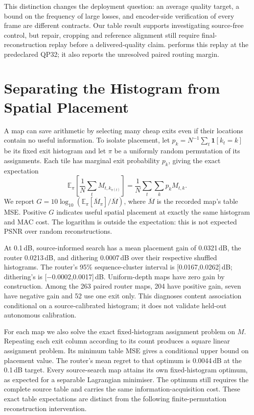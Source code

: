This distinction changes the deployment question: an average quality target,
a bound on the frequency of large losses, and encoder-side verification of
every frame are different contracts. Our table result supports investigating
source-free control, but repair, cropping and reference alignment still
require final-reconstruction replay before a delivered-quality claim.
 performs this replay at the predeclared QP32; it
also reports the unresolved paired routing margin.

\section{Separating the Histogram from Spatial Placement}

A map can save arithmetic by selecting many cheap exits even if their
locations contain no useful information. To isolate placement, let
$p_k=N^{-1}\sum_t\mathbf{1}[k_t=k]$ be its fixed exit histogram and let
$\pi$ be a uniformly random permutation of its assignments. Each tile has
marginal exit probability $p_k$, giving the exact expectation
\begin{equation}
 \mathbb{E}_{\pi}\!\left[\frac1N\sum_t M_{t,k_{\pi(t)}}\right]
 =\frac1N\sum_t\sum_k p_k M_{t,k}.
 \label{eq:permutation}
\end{equation}
We report $G=10\log_{10}(\mathbb E_\pi[\overline M_\pi]/\overline M)$,
where $\overline M$ is the recorded map's table MSE. Positive $G$ indicates
useful spatial placement at exactly the same histogram and MAC cost.
The logarithm is outside the expectation: this is not expected PSNR over
random reconstructions.

At 0.1\,dB, source-informed search has a mean placement gain of 0.0321\,dB,
the router 0.0213\,dB, and dithering 0.0007\,dB over their respective shuffled
histograms. The router's 95\% sequence-cluster interval is
[0.0167,0.0262]\,dB; dithering's is [$-0.0002$,0.0017]\,dB. Uniform-depth
maps have zero gain by construction. Among the 263 paired router maps,
204 have positive gain, seven have negative gain and 52 use one exit only.
This diagnoses content association conditional on a source-calibrated
histogram; it does not validate held-out autonomous calibration.

For each map we also solve the exact fixed-histogram assignment problem on
$M$. Repeating each exit column according to its count produces a square
linear assignment problem. Its minimum table MSE gives a conditional upper
bound on placement value. The router's mean regret to that optimum is
0.0044\,dB at the 0.1\,dB target. Every source-search map attains its own
fixed-histogram optimum, as expected for a separable Lagrangian minimiser.
The optimum still requires the complete source table and carries the same
information-acquisition cost. These exact table expectations are distinct
from the following finite-permutation reconstruction intervention.

